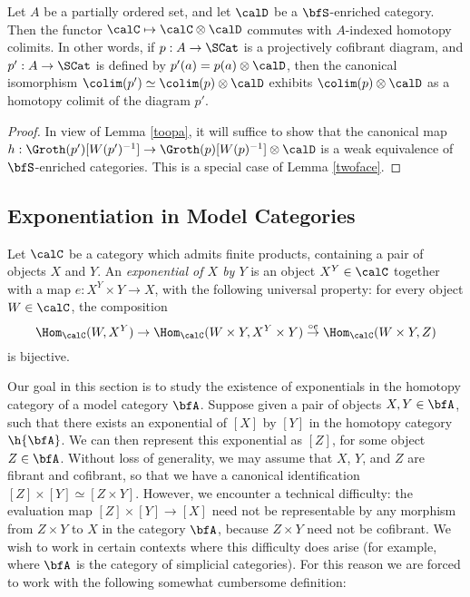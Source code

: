 \begin{theorem}\label{tubba}
Let $A$ be a partially ordered set, and let $\calD$ be a $\bfS$-enriched category.
Then the functor $\calC \mapsto \calC \otimes \calD$ commutes with $A$-indexed homotopy colimits. In other words, if $p: A \rightarrow \SCat$ is a projectively cofibrant diagram,
and $p': A \rightarrow \SCat$ is defined by $p'(a) = p(a) \otimes \calD$, then the canonical isomorphism $\colim(p') \simeq \colim(p) \otimes \calD$ exhibits $\colim(p) \otimes \calD$
as a homotopy colimit of the diagram $p'$.
\end{theorem}

\begin{proof}
In view of Lemma \ref{toopa}, it will suffice to show that the canonical map
$h: \Groth(p')[ W(p')^{-1} ] \rightarrow \Groth(p)[W(p)^{-1}] \otimes \calD$
is a weak equivalence of $\bfS$-enriched categories. This is a special case of
Lemma \ref{twoface}.
\end{proof}

\subsection{Exponentiation in Model Categories}\label{camper}

Let $\calC$ be a category which admits finite products, containing a pair of objects $X$ and $Y$.
An {\it exponential of $X$ by $Y$} is an object $X^Y \in \calC$ together with a map
$e: X^Y \times Y \rightarrow X$, with the following universal property: for every
object $W \in \calC$, the composition
$$ \Hom_{\calC}( W, X^Y) \rightarrow \Hom_{\calC}( W \times Y, X^Y \times Y)
\stackrel{\circ e}{\rightarrow} \Hom_{\calC}(W \times Y, Z)$$
is bijective.

Our goal in this section is to study the existence of exponentials in the homotopy category
of a model category $\bfA$. Suppose given a pair of objects $X, Y \in \bfA$, such that there
exists an exponential of $[X]$ by $[Y]$ in the homotopy category $\h{\bfA}$. 
We can then represent this exponential as $[Z]$, for some object $Z \in \bfA$. 
Without loss of generality, we may assume that $X$, $Y$, and $Z$ are fibrant and cofibrant,
so that we have a canonical identification $[Z] \times [Y] \simeq [Z \times Y]$. However,
we encounter a technical difficulty: the evaluation map $[Z] \times [Y] \rightarrow [X]$ need
not be representable by any morphism from $Z \times Y$ to $X$ in the category $\bfA$, because
$Z \times Y$ need not be cofibrant. We wish to work in certain contexts where this difficulty
does arise (for example, where $\bfA$ is the category of simplicial categories). For this reason we are forced to work with the following somewhat cumbersome definition:

